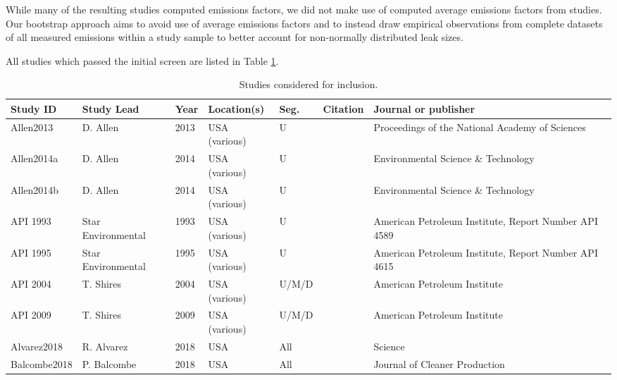 \documentclass[11pt]{report}
\begin{document}
{{{{While many of the resulting studies computed emissions factors, we did not make use of computed average emissions factors from studies. Our bootstrap approach aims to avoid use of average emissions factors and to instead draw empirical observations from complete datasets of all measured emissions within a study sample to better account for non-normally distributed leak sizes.

All studies which passed the initial screen are listed in Table \ref{tab:VF_component_studies}.

\clearpage

\begin{landscape}
\begin{table}[]
\begin{scriptsize}
\caption{Studies considered for inclusion.}
\label{tab:VF_component_studies}
\begin{tabular*}{1\columnwidth}{lllllll}
\toprule
Study ID		& Study Lead   & Year & Location(s)    & Seg.  & Citation        & Journal or publisher        \\
\midrule
Allen2013         		& D. Allen     		& 2013 	& USA (various)  	& U     	& \cite{Allen2013}    & Proceedings of the National Academy of Sciences\\
Allen2014a       	 	& D. Allen     		& 2014 	& USA (various)  	& U     	& \cite{Allen2014a}  & Environmental Science \& Technology   \\
Allen2014b        	& D. Allen     		& 2014 	& USA (various)  	& U    	& \cite{Allen2014b}       & Environmental Science \& Technology   \\
API 1993		& Star Environmental     	& 1993 	& USA (various)  	& U     	& \cite{API1993a}& American Petroleum Institute, Report Number API 4589      \\
API 1995		& Star Environmental     	& 1995 	& USA (various)  	& U     	& \cite{API1995a}& American Petroleum Institute, Report Number API 4615      \\
API 2004		& T. Shires   		& 2004 	& USA (various)  	& U/M/D 	& \cite{Shires2004}        & American Petroleum Institute\\
API 2009		& T. Shires    		& 2009 	& USA (various)  	& U/M/D 	&\cite{Shires2009}         & American Petroleum Institute\\
Alvarez2018       	& R. Alvarez  		& 2018 	& USA  		& All   	& \cite{Alvarez2018}        & Science \\
Balcombe2018      	& P. Balcombe  	& 2018 	& USA  		& All   	& \cite{Balcombe2018}      & Journal of Cleaner Production         \\

\end{tabular*}
\end{scriptsize}
\end{table}
\end{landscape}}}}}
\end{document}
